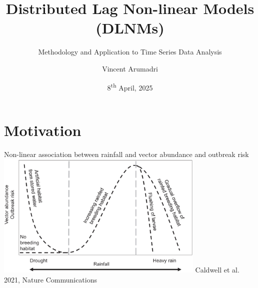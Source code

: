 \documentclass[english]{beamer}
\title{Distributed Lag Non-linear Models (DLNMs)}
\subtitle{Methodology and Application to Time Series Data Analysis }
\author{Vincent Arumadri}
\institute{Department of Public Health \\
        \vspace{0.3cm} Erasmus MC}
\date{8\textsuperscript{th} April, 2025}
\begin{document}
\begin{frame}
    \titlepage
\end{frame}
\section{Motivation}
\begin{frame}{Non-linear association between rainfall and vector abundance and outbreak risk}
        \centering
        \includegraphics[width=10cm,keepaspectratio]{images/nonlinear_effect_outbreaks.png}
        \vspace{0.3cm}
        {\footnotesize Caldwell et al. 2021, Nature Communications}
\end{frame}
\end{document}
